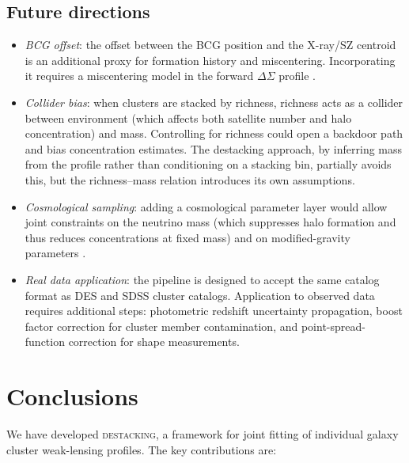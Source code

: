 \documentclass[12pt,a4paper]{article}
\begin{document}
\subsection{Future directions}

\begin{itemize}
  \item \textit{BCG offset}: the offset between the BCG position and the X-ray/SZ
    centroid is an additional proxy for formation history and miscentering.
    Incorporating it requires a miscentering model in the forward $\Delta\Sigma$
    profile \citep{Johnston2007,George2012}.
  \item \textit{Collider bias}: when clusters are stacked by richness, richness acts
    as a collider between environment (which affects both satellite number and halo
    concentration) and mass.  Controlling for richness could open a backdoor path and
    bias concentration estimates.  The destacking approach, by inferring mass from
    the profile rather than conditioning on a stacking bin, partially avoids this, but
    the richness--mass relation introduces its own assumptions.
  \item \textit{Cosmological sampling}: adding a cosmological parameter layer would
    allow joint constraints on the neutrino mass (which suppresses halo formation and
    thus reduces concentrations at fixed mass) and on modified-gravity parameters
    \citep{Barreira2015}.
  \item \textit{Real data application}: the pipeline is designed to accept the same
    catalog format as DES and SDSS cluster catalogs.  Application to observed data
    requires additional steps: photometric redshift uncertainty propagation, boost
    factor correction for cluster member contamination, and point-spread-function
    correction for shape measurements.
\end{itemize}

\section{Conclusions}
\label{sec:conclusions}

We have developed \textsc{destacking}, a framework for joint fitting of individual
galaxy cluster weak-lensing profiles.  The key contributions are:
\end{document}
